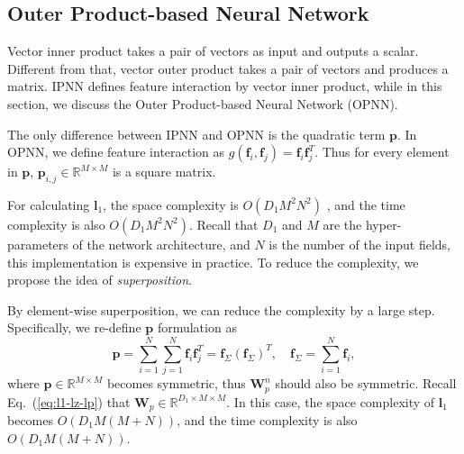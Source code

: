 \documentclass[conference]{IEEEtran}
\newcommand{\bs}{\boldsymbol}
\newcommand{\bW}{\bs{W}}
\newcommand{\bl}{\bs{l}}
\newcommand{\bz}{\bs{z}}
\newcommand{\bp}{\bs{p}}
\newcommand{\Bf}{\bs{f}}
\newcommand{\mR}{\mathbb{R}}
\begin{document}
\subsection{Outer Product-based Neural Network}\label{sec:pnn-ii}
Vector inner product takes a pair of vectors as input and outputs a scalar. Different from that, vector outer product takes a pair of vectors and produces a matrix. IPNN defines feature interaction by vector inner product, while in this section, we discuss the Outer Product-based Neural Network (OPNN).

The only difference between IPNN and OPNN is the quadratic term $\bp$.
In OPNN, we define feature interaction as $g(\Bf_i,\Bf_j) = \Bf_i \Bf_j^T$. Thus for every element in $\bp$, $\bp_{i,j} \in \mR^{M \times M}$ is a square matrix.

For calculating $\bl_1$, the space complexity is $O(D_1M^2N^2)$ , and the time complexity is also $O(D_1M^2N^2)$. Recall that $D_1$ and $M$ are the hyper-parameters of the network architecture, and $N$ is the number of the input fields, this implementation is expensive in practice. To reduce the complexity, we propose the idea of \emph{superposition}.

By element-wise superposition, we can reduce the complexity by a large step. Specifically, we re-define $\bp$ formulation as
\begin{equation}
\bp = \sum_{i=1}^{N}{\sum_{j=1}^N{\Bf_i \Bf_j^T}} = \Bf_{\Sigma} (\Bf_{\Sigma})^T, \quad \Bf_{\Sigma} = \sum_{i=1}^N {\Bf_i},
\end{equation}
where $\bp \in \mR^{M \times M}$ becomes symmetric, thus $\bW_p^n$ should also be symmetric.
Recall Eq.~(\ref{eq:l1-lz-lp}) that $\bW_p \in \mR^{D_1 \times M \times M}$. In this case, the space complexity of $\bl_1$ becomes $O(D_1M(M+N))$, and the time complexity is also $O(D_1M(M+N))$.
\end{document}
